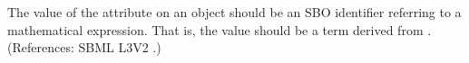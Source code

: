 The value of the attribute  on an \EventAssignment object
should be an SBO identifier referring to a mathematical expression.  That
is, the value should be a term derived from \sbomathformula.  (References:
SBML L3V2 .)
